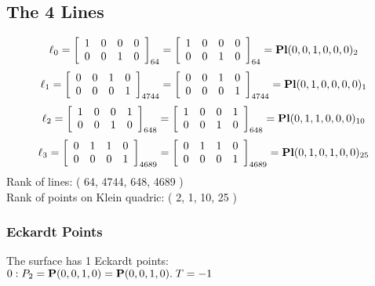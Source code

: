 \documentclass{article}
\newcommand{\bP}{{\bf P}}
\begin{document}
{\subsection*{The 4 Lines}
$$
\ell_{0} = 
\left[
\begin{array}{*{4}{r}}
1 & 0 & 0 & 0\\
0 & 0 & 1 & 0\\
\end{array}
\right]
_{64}
=
\left[
\begin{array}{*{4}c}
1  & 0  & 0  & 0\\
0  & 0  & 1  & 0\\
\end{array}
\right]_{64}
={\rm\bf Pl}(0,0,1,0,0,0 )_{2}$$
$$
\ell_{1} = 
\left[
\begin{array}{*{4}{r}}
0 & 0 & 1 & 0\\
0 & 0 & 0 & 1\\
\end{array}
\right]
_{4744}
=
\left[
\begin{array}{*{4}c}
0  & 0  & 1  & 0\\
0  & 0  & 0  & 1\\
\end{array}
\right]_{4744}
={\rm\bf Pl}(0,1,0,0,0,0 )_{1}$$
$$
\ell_{2} = 
\left[
\begin{array}{*{4}{r}}
1 & 0 & 0 & 1\\
0 & 0 & 1 & 0\\
\end{array}
\right]
_{648}
=
\left[
\begin{array}{*{4}c}
1  & 0  & 0  & 1\\
0  & 0  & 1  & 0\\
\end{array}
\right]_{648}
={\rm\bf Pl}(0,1,1,0,0,0 )_{10}$$
$$
\ell_{3} = 
\left[
\begin{array}{*{4}{r}}
0 & 1 & 1 & 0\\
0 & 0 & 0 & 1\\
\end{array}
\right]
_{4689}
=
\left[
\begin{array}{*{4}c}
0  & 1  & 1  & 0\\
0  & 0  & 0  & 1\\
\end{array}
\right]_{4689}
={\rm\bf Pl}(0,1,0,1,0,0 )_{25}$$
Rank of lines: ( 64, 4744, 648, 4689 )\\
Rank of points on Klein quadric: ( 2, 1, 10, 25 )\\
\subsubsection*{Eckardt Points}
The surface has 1 Eckardt points:\\
$0 : P_{2}=\bP(0, 0, 1, 0) = \bP(0, 0, 1, 0).\; T= -1$\\
}
\end{document}
